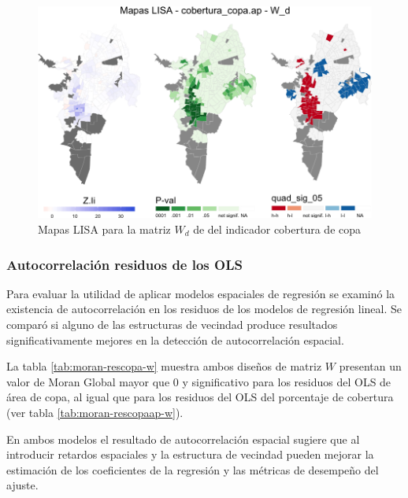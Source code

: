 \documentclass[12pt,a4paper,openany]{book}
\theoremstyle{definition}
\theoremstyle{definition}
\theoremstyle{definition}
\theoremstyle{remark}
\begin{document}
\begin{figure}[H]

{\centering \includegraphics[width=1\linewidth]{tesis-unigis_files/figure-latex/mapas-lisa-copaap-wd-1} 

}

\caption{Mapas LISA para la matriz $W_d$ de del indicador cobertura de copa}\label{fig:mapas-lisa-copaap-wd}
\end{figure}

\subsubsection{Autocorrelación residuos de los
OLS}\label{autocorrelaciuxf3n-residuos-de-los-ols}

Para evaluar la utilidad de aplicar modelos espaciales de regresión se
examinó la existencia de autocorrelación en los residuos de los modelos
de regresión lineal. Se comparó si alguno de las estructuras de vecindad
produce resultados significativamente mejores en la detección de
autocorrelación espacial.

La tabla \ref{tab:moran-rescopa-w} muestra ambos diseños de matriz \(W\)
presentan un valor de Moran Global mayor que 0 y significativo para los
residuos del OLS de área de copa, al igual que para los residuos del OLS
del porcentaje de cobertura (ver tabla \ref{tab:moran-rescopaap-w}).

En ambos modelos el resultado de autocorrelación espacial sugiere que al
introducir retardos espaciales y la estructura de vecindad pueden
mejorar la estimación de los coeficientes de la regresión y las métricas
de desempeño del ajuste.
\end{document}
